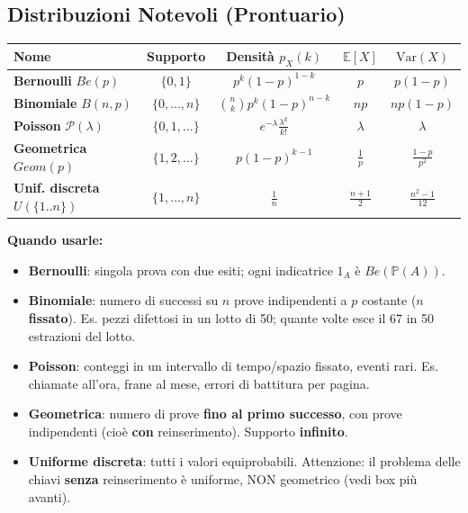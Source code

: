 \documentclass[12pt]{extarticle} %
\begin{document}
\subsection{Distribuzioni Notevoli (Prontuario)}
\begin{center}
\renewcommand{\arraystretch}{1.6}
\begin{tabular}{|l|c|c|c|c|}
\hline
\textbf{Nome} & \textbf{Supporto} & \textbf{Densità $p_X(k)$} & $\mathbb{E}[X]$ & $\mathrm{Var}(X)$ \\ \hline
\textbf{Bernoulli} $Be(p)$ & $\{0, 1\}$ & $p^k(1-p)^{1-k}$ & $p$ & $p(1-p)$ \\ \hline
\textbf{Binomiale} $B(n,p)$ & $\{0, \dots, n\}$ & $\binom{n}{k} p^k (1-p)^{n-k}$ & $np$ & $np(1-p)$ \\ \hline
\textbf{Poisson} $\mathcal{P}(\lambda)$ & $\{0, 1, \dots\}$ & $e^{-\lambda} \frac{\lambda^k}{k!}$ & $\lambda$ & $\lambda$ \\ \hline
\textbf{Geometrica} $Geom(p)$ & $\{1, 2, \dots\}$ & $p(1-p)^{k-1}$ & $\frac{1}{p}$ & $\frac{1-p}{p^2}$ \\ \hline
\textbf{Unif. discreta} $U(\{1..n\})$ & $\{1,\dots,n\}$ & $\frac{1}{n}$ & $\frac{n+1}{2}$ & $\frac{n^2-1}{12}$ \\ \hline
\end{tabular}
\end{center}
\textbf{Quando usarle:}
\begin{itemize}[-]
    \item \textbf{Bernoulli}: singola prova con due esiti; ogni indicatrice $1_A$ è $Be(\mathbb{P}(A))$.
    \item \textbf{Binomiale}: numero di successi su $n$ prove indipendenti a $p$ costante ($n$ \textbf{fissato}). {\footnotesize Es. pezzi difettosi in un lotto di 50; quante volte esce il 67 in 50 estrazioni del lotto.}
    \item \textbf{Poisson}: conteggi in un intervallo di tempo/spazio fissato, eventi rari. {\footnotesize Es. chiamate all'ora, frane al mese, errori di battitura per pagina.}
    \item \textbf{Geometrica}: numero di prove \textbf{fino al primo successo}, con prove indipendenti (cioè \textbf{con} reinserimento). Supporto \textbf{infinito}.
    \item \textbf{Uniforme discreta}: tutti i valori equiprobabili. {\footnotesize Attenzione: il problema delle chiavi \textbf{senza} reinserimento è uniforme, NON geometrico (vedi box più avanti).}
\end{itemize}
\end{document}
